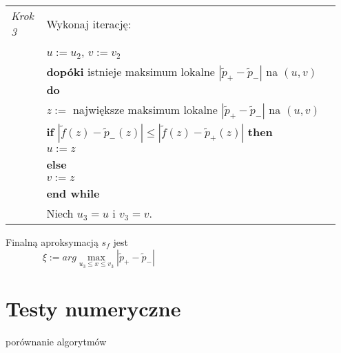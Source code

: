 \documentclass[oik, pdftex, robocza, man]{mgrwms}
\begin{document}
\begin{tabular}{p{0.10\linewidth} p{0.85\linewidth}}
    \textit{Krok 3} & Wykonaj iterację: \\
                    & $u := u_2$, $v := v_2$ \\
                    & \textbf{dopóki} istnieje maksimum lokalne $|\tilde{p}_{+} - \tilde{p}_{-}|$ na $(u,v)$ \textbf{do} \\
                    & \hspace{20pt}$z :=$ największe maksimum lokalne $|\tilde{p}_{+} - \tilde{p}_{-}|$ na $(u,v)$ \\
                    & \hspace{20pt}\textbf{if} $|\tilde{f}(z) - \tilde{p}_{-}(z)| \leq |\tilde{f}(z) - \tilde{p}_{+}(z)|$ \textbf{then} \\
                    & \hspace{40pt}$u:= z$ \\
                    & \hspace{20pt}\textbf{else} \\
                    & \hspace{40pt}$v:= z$ \\
                    & \textbf{end while} \\
                    & Niech $u_3 = u$ i $v_3 = v$.
\end{tabular} \vspace{10pt}

Finalną aproksymacją $s_f$ jest
\begin{equation*}
        \xi := arg \max_{u_3 \leq x \leq v_3}|\tilde{p}_{+} - \tilde{p}_{-}| \hspace{200pt}
\end{equation*}


\mgrclosechapter



\chapter{Testy numeryczne}

porównanie algorytmów

\mgrclosechapter




\end{document}
